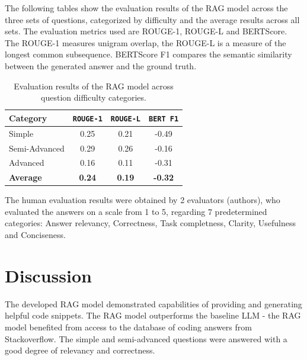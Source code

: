 \documentclass[fleqn,moreauthors,10pt]{ds_report}
\begin{document}
The following tables show the evaluation results of the RAG model across the three sets of questions, categorized by difficulty and the average results across all sets. The evaluation metrics used are ROUGE-1, ROUGE-L and BERTScore. The ROUGE-1 measures unigram overlap, the ROUGE-L is a measure of the longest common subsequence. BERTScore F1 compares the semantic similarity between the generated answer and the ground truth.

\begin{table}[h]
\centering
\caption{Evaluation results of the RAG model across question difficulty categories.}
\begin{tabular}{lccc}
\toprule
\textbf{Category} & \texttt{ROUGE-1} & \texttt{ROUGE-L} & \texttt{BERT F1} \\
\midrule
Simple         & 0.25 & 0.21 & -0.49 \\
Semi-Advanced  & 0.29 & 0.26 & -0.16 \\
Advanced       & 0.16 & 0.11 & -0.31 \\
\midrule
\textbf{Average} & \textbf{0.24} & \textbf{0.19} & \textbf{-0.32} \\
\bottomrule
\end{tabular}
\label{tab:rag_results}
\end{table}


The human evaluation results were obtained by 2 evaluators (authors), who evaluated the answers on a scale from 1 to 5, regarding 7 predetermined categories: Answer relevancy, Correctness, Task completness, Clarity, Usefulness and Conciseness. 







\section*{Discussion}
The developed RAG model demonstrated capabilities of providing and generating helpful code snippets. The RAG model outperforms the baseline LLM - the RAG model benefited from access to the database of coding answers from Stackoverflow.  The simple and semi-advanced questions were answered with a good degree of relevancy and correctness. 







\end{document}
